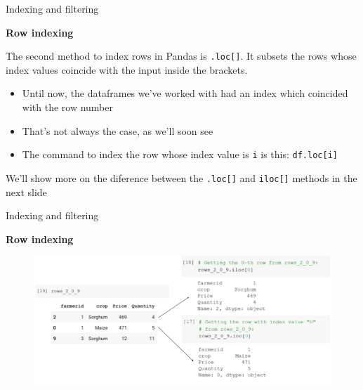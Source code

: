 \documentclass[aspectratio=169]{beamer}
\begin{document}
\begin{frame}{Indexing and filtering}

	\textbf{Row indexing}

	The second method to index rows in Pandas is \texttt{.loc[]}. It subsets the rows whose index values coincide with the input inside the brackets.

	\begin{itemize}
		\item Until now, the dataframes we've worked with had an index which coincided with the row number
		\item That's not always the case, as we'll soon see
		\item The command to index the row whose index value is \texttt{i} is this: \texttt{df.loc[i]}
	\end{itemize}

	We'll show more on the diference between the \texttt{.loc[]} and \texttt{iloc[]} methods in the next slide

\end{frame}

\begin{frame}{Indexing and filtering}

	\textbf{Row indexing}

	\begin{figure}
		\centering
		\includegraphics[width=\linewidth]{img/row_loc_iloc.png}
	\end{figure}

\end{frame}
\end{document}
